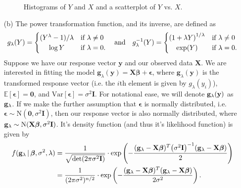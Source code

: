 \documentclass[10pt]{article}
\begin{document}
\begin{itemize}
\begin{figure}[ht]
        \caption{Histograms of \(Y\) and \(X\) and a scatterplot of \(Y\) vs. \(X\).}
        \label{q01-investigation}
    \end{figure}
    \item[(b)] The power transformation function, and its inverse, are defined as 
    \begin{align*}
        g_{\lambda}(Y) 
        = \begin{cases}
            (Y^{\lambda} - 1) / \lambda & \text{if } \lambda \neq 0 \\
            \hfil \log Y & \text{if } \lambda = 0.
        \end{cases}
        ~~~\text{and}~~~
        g_{\lambda}^{-1}(Y) 
        = \begin{cases}
            \left( 1 + \lambda Y \right)^{1 / \lambda} & \text{if } \lambda \neq 0 \\
             \hfil \mathrm{exp}(Y) & \text{if } \lambda = 0.
        \end{cases}
    \end{align*}
    Suppose we have our response vector \(\mathbf{y}\) and our observed data \(\mathbf{X}\). 
    We are interested in fitting the model \(\mathbf{g}_{\lambda}(\mathbf{y}) = \mathbf{X}\bm{\beta} + \bm{\epsilon}\), where \(\mathbf{g}_{\lambda}(\mathbf{y})\)
    is the transformed response vector (i.e. the \(i\)th element is given by \(g_{\lambda}(y_i)\)), \(\mathbb{E}[\bm{\epsilon}] = \mathbf{0}\), and 
    \(\mathrm{Var}[\bm{\epsilon}] = \sigma^2 \mathbf{I}\). 
    For notational ease, we will denote \(\mathbf{g}_{\lambda}(\mathbf{y})\) as \(\mathbf{g}_{\lambda}\). 
    If we make the further assumption that \(\bm{\epsilon}\) is normally distributed, i.e. 
    \(\bm{\epsilon} \sim \mathrm{N}(\mathbf{0}, \sigma^2 \mathbf{I})\), then our response vector is also normally distributed, where
    \(\mathbf{g}_{\lambda} \sim \mathrm{N}(\mathbf{X}\bm{\beta}, \sigma^2 \mathbf{I})\). It's density function (and thus it's likelihood function) is given by 
    \begin{align*}
        f(\myg \,|\, \bm{\beta}, \sigma^2, \lambda)
        &= \frac{1}{\sqrt{\mathrm{det}(2 \pi \sigma^2 \mathbf{I})}} \cdot \mathrm{exp} \left( - \frac{(\myg - \mathbf{X}\bm{\beta})^T \big( \sigma^2 \mathbf{I} \big)^{-1} (\myg - \mathbf{X}\bm{\beta})}{2} \right) \\
        &= \frac{1}{(2\pi\sigma^2)^{n/2}} \cdot \mathrm{exp} \left( - \frac{(\myg - \mathbf{X}\bm{\beta})^T (\myg - \mathbf{X}\bm{\beta})}{2 \sigma^2} \right).

\end{align*}
\end{itemize}
\end{document}
